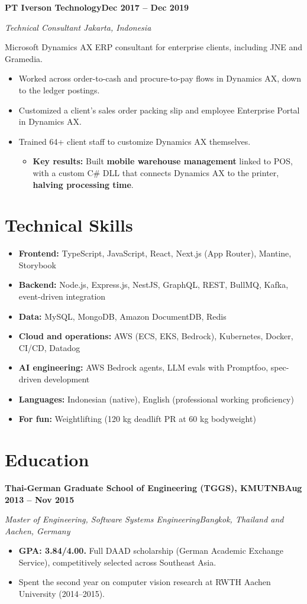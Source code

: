 \documentclass[11pt,letterpaper]{article}
\newcommand{\company}[2]{%
  \Needspace{8\baselineskip}
  \vspace{8pt}
  {\headfont\bfseries\color{heading}#1\hfill#2\par}
}
\newcommand{\role}[4]{%
  \Needspace{6\baselineskip}
  \vspace{2pt}
  {\itshape\color{muted}#1\if\relax\detokenize{#2}\relax\else{} \textbar{} #2\fi\hfill #3\par}
  \vspace{1pt}
  #4\par
}
\newcommand{\keyResults}[1]{\item \textbf{Key results:} #1}
\newcommand{\school}[2]{%
  \Needspace{5\baselineskip}
  \vspace{8pt}
  {\headfont\bfseries\color{heading}#1\hfill#2\par}
}
\newcommand{\degree}[2]{%
  \vspace{2pt}
  {\itshape\color{muted}#1\hfill #2\par}
}
\newcommand{\skillLine}[2]{\item \textbf{#1:} #2}
\begin{document}
\company{PT Iverson Technology}{Dec 2017 -- Dec 2019}
\role{Technical Consultant}{}{Jakarta, Indonesia}{Microsoft Dynamics AX ERP consultant for enterprise clients, including JNE and Gramedia.}
\begin{itemize}
  \item Worked across order-to-cash and procure-to-pay flows in Dynamics AX, down to the ledger postings.
  \item Customized a client's sales order packing slip and employee Enterprise Portal in Dynamics AX.
  \item Trained 64+ client staff to customize Dynamics AX themselves.
  \begin{itemize}
    \keyResults{Built \textbf{mobile warehouse management} linked to POS, with a custom C\# DLL that connects Dynamics AX to the printer, \textbf{halving processing time}.}
  \end{itemize}
\end{itemize}

\section{Technical Skills}
\begin{itemize}[label={}, leftmargin=0pt]
  \skillLine{Frontend}{TypeScript, JavaScript, React, Next.js (App Router), Mantine, Storybook}
  \skillLine{Backend}{Node.js, Express.js, NestJS, GraphQL, REST, BullMQ, Kafka, event-driven integration}
  \skillLine{Data}{MySQL, MongoDB, Amazon DocumentDB, Redis}
  \skillLine{Cloud and operations}{AWS (ECS, EKS, Bedrock), Kubernetes, Docker, CI/CD, Datadog}
  \skillLine{AI engineering}{AWS Bedrock agents, LLM evals with Promptfoo, spec-driven development}
  \skillLine{Languages}{Indonesian (native), English (professional working proficiency)}
  \skillLine{For fun}{Weightlifting (120 kg deadlift PR at 60 kg bodyweight)}
\end{itemize}

\section{Education}
\school{Thai-German Graduate School of Engineering (TGGS), KMUTNB}{Aug 2013 -- Nov 2015}
\degree{Master of Engineering, Software Systems Engineering}{Bangkok, Thailand and Aachen, Germany}
\begin{itemize}
  \item \textbf{GPA: 3.84/4.00.} Full DAAD scholarship (German Academic Exchange Service), competitively selected across Southeast Asia.
  \item Spent the second year on computer vision research at RWTH Aachen University (2014--2015).
\end{itemize}
\end{document}
